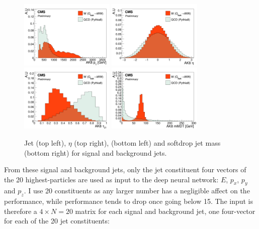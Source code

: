 \begin{figure}[h!]
\centering
\includegraphics[width=0.4\textwidth]{figures/vtagging/AN-18-099/input/inputs/sig-bkg/jpt.png}
\includegraphics[width=0.4\textwidth]{figures/vtagging/AN-18-099/input/inputs/sig-bkg/jeta.png}\\
\includegraphics[width=0.4\textwidth]{figures/vtagging/AN-18-099/input/inputs/sig-bkg/jtau21.png}
\includegraphics[width=0.4\textwidth]{figures/vtagging/AN-18-099/input/inputs/sig-bkg/msoftdrop_beta0.png}
\caption{Jet \PT (top left), $\eta$ (top right), \nsubj (bottom left) and softdrop jet mass (bottom right) for signal and background jets.}
\label{fig:lola:kinematics}
\end{figure}
From these signal and background jets, only the jet constituent four vectors of the 20 highest-\PT particles are used as input to the deep neural network: $E$, $p_x$, $p_y$ and $p_z$. I use 20 constituents as any larger number has a negligible affect on the performance, while performance tends to drop once going below 15. The input is therefore a $4 \times N=20$ matrix for each signal and background jet, one four-vector for each of the 20 jet constituents:

